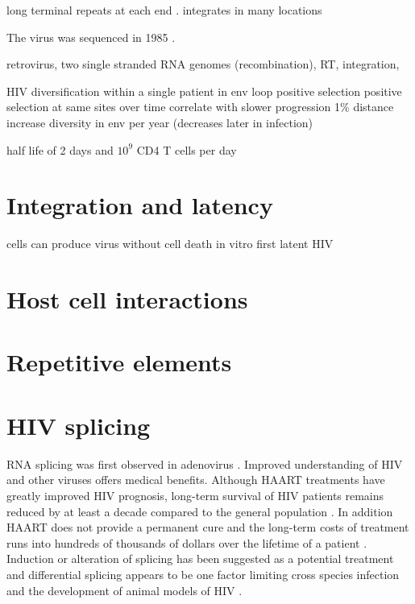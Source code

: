 \documentclass[../sherrill-Mix_thesis.tex]{subfiles}
\begin{document}
\begin{description}
\end{description}









long terminal repeats at each end \citep{Hughes1978}. integrates in many locations \citep{Hughes1978}


The virus was sequenced in 1985 \citep{Wain-Hobson1985}.

retrovirus, two single stranded RNA genomes (recombination), RT, integration,

HIV diversification within a single patient in env loop \citep{Holmes1992} positive selection \citep{Bonhoeffer1995,Ross2002} positive selection at same sites over time correlate with slower progression \citep{Wolinsky1996,Ross2002} 1\% distance increase diversity in env per year (decreases later in infection) \citep{Shankarappa1999}

half life of 2 days and $10^9$ CD4 T cells per day \citep{Ho1995,Wei1995}
\section{Integration and latency}
	cells can produce virus without cell death in vitro \citep{Hoxie1985}
	first latent HIV \citep{Folks1986}
\section{Host cell interactions}
\section{Repetitive elements}
\section{HIV splicing}
	RNA splicing was first observed in adenovirus \citep{Berget1977,Chow1977}. Improved understanding of HIV and other viruses offers medical benefits. Although HAART treatments have greatly improved HIV prognosis, long-term survival of HIV patients remains reduced by at least a decade compared to the general population \citep{Lohse2007}. In addition HAART does not provide a permanent cure \citep{Richman2009} and the long-term costs of treatment runs into hundreds of thousands of dollars over the lifetime of a patient \citep{Hutchinson2006,Schackman2006}.  Induction or alteration of splicing has been suggested as a potential treatment \citep{Fukuhara2006,Mandal2010} and differential splicing appears to be one factor limiting cross species infection and the development of animal models of HIV \citep{Zheng2003}. 
\end{document}
